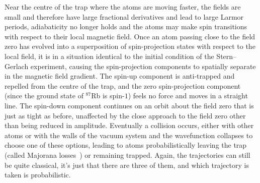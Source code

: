 Near the centre of the trap where the atoms are moving faster, the fields are small and therefore have large fractional derivatives and lead to large Larmor periods, adiabaticity no longer holds and the atoms may make spin transitions with respect to their local magnetic field. Once an atom passing close to the field zero has evolved into a superposition of spin-projection states with respect to the local field, it is in a situation identical to the initial condition of the Stern--Gerlach experiment, causing the spin-projection components to spatially separate in the magnetic field gradient. The spin-up component is anti-trapped and repelled from the centre of the trap, and the zero spin-projection component (since the ground state of $^{87}$Rb is spin-$1$) feels no force and moves in a straight line. The spin-down component continues on an orbit about the field zero that is just as tight as before, unaffected by the close approach to the field zero other than being reduced in amplitude. Eventually a collision occurs, either with other atoms or with the walls of the vacuum system and the wavefunction collapses to choose one of these options, leading to atoms probabilistically leaving the trap (called Majorana losses~\cite{Majorana1932, PhysRevLett.74.3352}) or remaining trapped. Again, the trajectories can still be quite classical, it's just that there are three of them, and which trajectory is taken is probabilistic.

